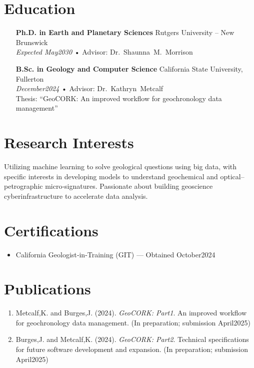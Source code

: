 \documentclass[10pt]{res}
\begin{document}
\section{Education}
\begin{itemize}[leftmargin=0.5cm]
  \item[\textbf{Ph.D. in Earth and Planetary Sciences} \hfill Rutgers University – New Brunswick \\]
    \textit{Expected May2030} • Advisor: Dr.~Shaunna~M.~Morrison
  \item[\textbf{B.Sc. in Geology and Computer Science} \hfill California State University, Fullerton \\]
    \textit{December2024} • Advisor: Dr.~Kathryn~Metcalf \\ Thesis: ``GeoCORK: An improved workflow for geochronology data management''
\end{itemize}

\section{Research Interests}
Utilizing machine learning to solve geological questions using big data, with specific interests in developing models to understand geochemical and optical–petrographic micro‑signatures. Passionate about building geoscience cyberinfrastructure to accelerate data analysis.

\section{Certifications}
\begin{itemize}[noitemsep]
  \item California Geologist‑in‑Training (GIT) — Obtained October2024
\end{itemize}

\section{Publications}
\begin{enumerate}[label=\arabic*., leftmargin=0.5cm]
  \item Metcalf,K. and Burges,J. (2024). \textit{GeoCORK: Part1}. An improved workflow for geochronology data management. (In preparation; submission April2025)
  \item Burges,J. and Metcalf,K. (2024). \textit{GeoCORK: Part2}. Technical specifications for future software development and expansion. (In preparation; submission April2025)
\end{enumerate}
\end{document}
